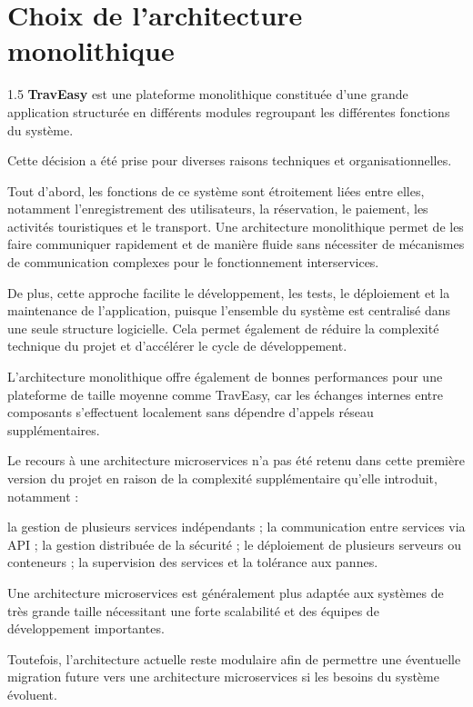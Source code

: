 \documentclass[a4paper,12pt]{report}
\begin{document}
\section{Choix de l'architecture monolithique}
\vspace{0.5cm}
\begin{spacing}{1.5}
\justifying
\textbf{TravEasy} est une plateforme monolithique constituée d'une grande application structurée en différents modules regroupant les différentes fonctions du système.

Cette décision a été prise pour diverses raisons techniques et organisationnelles.

Tout d'abord, les fonctions de ce système sont étroitement liées entre elles, notamment l'enregistrement des utilisateurs, la réservation, le paiement, les activités touristiques et le transport. Une architecture monolithique permet de les faire communiquer rapidement et de manière fluide sans nécessiter de mécanismes de communication complexes pour le fonctionnement interservices.

De plus, cette approche facilite le développement, les tests, le déploiement et la maintenance de l'application, puisque l'ensemble du système est centralisé dans une seule structure logicielle. Cela permet également de réduire la complexité technique du projet et d'accélérer le cycle de développement.

L'architecture monolithique offre également de bonnes performances pour une plateforme de taille moyenne comme TravEasy, car les échanges internes entre composants s'effectuent localement sans dépendre d'appels réseau supplémentaires.

Le recours à une architecture microservices n'a pas été retenu dans cette première version du projet en raison de la complexité supplémentaire qu'elle introduit, notamment :

la gestion de plusieurs services indépendants ;
la communication entre services via API ;
la gestion distribuée de la sécurité ;
le déploiement de plusieurs serveurs ou conteneurs ;
la supervision des services et la tolérance aux pannes.

Une architecture microservices est généralement plus adaptée aux systèmes de très grande taille nécessitant une forte scalabilité et des équipes de développement importantes.

Toutefois, l'architecture actuelle reste modulaire afin de permettre une éventuelle migration future vers une architecture microservices si les besoins du système évoluent.

\end{spacing}
\end{document}
